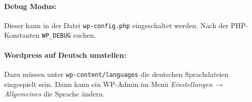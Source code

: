\documentclass[11pt,a4paper]{article}
\begin{document}
\paragraph{Debug Modus:}

Dieser kann in der Datei \texttt{wp-config.php} eingeschaltet werden.  Nach
der PHP-Konstanten \texttt{WP\_DEBUG} suchen.


\paragraph{Wordpress auf Deutsch umstellen:}

Dazu müssen unter \texttt{wp-content/languages} die deutschen Sprachdateien
eingespielt sein. Dann kann ein WP-Admin im Menü
\emph{Einstellungen\,$\to$\,Allgemeines} die Sprache ändern.
\end{document}
